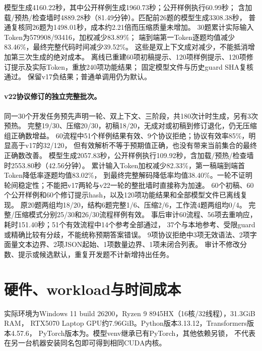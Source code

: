 \documentclass[UTF8,a4paper,11pt,fontset=fandol]{ctexart}
\begin{document}
模型生成4160.22秒，其中公开样例生成1960.73秒；公开样例执行60.99秒；
含加载/预热/检查墙时4889.28秒（81.49分钟）。匹配前26题的模型生成3308.38秒，
普通复核同26题为1498.01秒，成本约2.21倍而压缩质量未增加。
30题累计实际输入Token为579908/93416，加权减少83.89\%；
端到端第一Token逐题均值减少83.46\%，最终完整代码时间减少39.52\%。
这些是双上下文成对减少，不能抵消增加第三次生成的绝对成本。
离线已重建60项初稿提示、120项样例提示、120项修订提示及实际Token，重放240项功能结果；
固定模型文件与历史guard SHA复核通过。
保留v17负结果；普通单调用仍为默认。

\paragraph{v22协议修订的独立完整批次。}
同一30个开发任务预先声明一轮、双上下文、三阶段，共180次计时生成，另有3次预热。
完整19/30、压缩20/30，初稿18/20，无成对或初稿到修订退化，仍无压缩组正确数增益。
60流程中51个样例结果有效、9个协议拒绝；协议有效率85\%，明显高于v17的32/120，
但有效解析不等于预期值正确，也没有带来当前集合的最终正确数改善。
模型生成2057.83秒，公开样例执行109.92秒，含加载/预热/检查墙时2553.80秒（42.56分钟）。
累计输入Token加权减少82.33\%，第一稿端到端首Token降低率逐题均值83.02\%，
到最终完整解码降低率均值38.40\%。一轮不证明轮间稳定性；不能把v17两轮与v22一轮的整批墙时直接称为加速。
60个初稿、60个公开样例和60个修订提示hash，以及120项功能结果和全部模型文件已离线复现。
原20题两组均18/20，结构6题完整1/6、压缩2/6，工作流4题两组均0/4。
完整/压缩模式分别25/30和26/30流程样例有效。
事后审计60流程、56项去重响应，耗时151.40秒；51个有效流程中14个参考全部通过，
37个与本地参考、受限guard或精确比较有分歧，不能统称预期答案错误。
9项协议拒绝中3项无效语法、2项字面量文本边界、2项JSON起始、1项数量边界、1项未闭合列表。
审计不修改分数、提示或候选默认，重复开发题不计新增持出任务。

\section{硬件、workload与时间成本}
实际环境为Windows 11 build 26200，Ryzen 9 8945HX（16核/32线程），31.3GiB RAM，
RTX5070 Laptop GPU约7.96GiB。Python版本3.13.12，Transformers版本4.57.6，
PyTorch版本为。模型venv继承已有PyTorch，其他依赖另锁，
不代表在另一台机器安装同名包即可得到相同CUDA内核。
\end{document}
